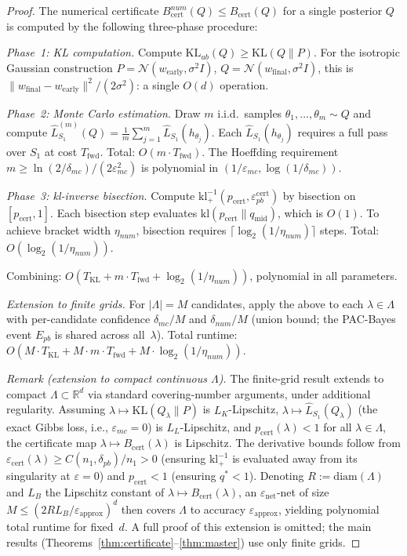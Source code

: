 \documentclass[11pt,a4paper]{article}
\newcommand{\kl}{\mathrm{kl}}
\newcommand{\KL}{\mathrm{KL}}
\newcommand{\R}{\mathbb{R}}
\newcommand{\klinv}{\kl^{-1}_+}
\begin{document}
\begin{proof}
The numerical certificate $B_{\mathrm{cert}}^{num}(Q) \le B_{\mathrm{cert}}(Q)$ for a single posterior $Q$ is computed by the following three-phase procedure:

\emph{Phase~1: KL computation.} Compute $\KL_{ub}(Q) \ge \KL(Q\|P)$. For the isotropic Gaussian construction $P = \mathcal{N}(w_{\mathrm{early}}, \sigma^2 I)$, $Q = \mathcal{N}(w_{\mathrm{final}}, \sigma^2 I)$, this is $\|w_{\mathrm{final}} - w_{\mathrm{early}}\|^2/(2\sigma^2)$: a single $O(d)$ operation.

\emph{Phase~2: Monte Carlo estimation.} Draw $m$ i.i.d.\ samples $\theta_1, \dots, \theta_m \sim Q$ and compute $\hat{L}_{S_1}^{(m)}(Q) = \frac{1}{m}\sum_{j=1}^m \hat{L}_{S_1}(h_{\theta_j})$. Each $\hat{L}_{S_1}(h_{\theta_j})$ requires a full pass over $S_1$ at cost $T_{\mathrm{fwd}}$. Total: $O(m \cdot T_{\mathrm{fwd}})$. The Hoeffding requirement $m \ge \ln(2/\delta_{mc})/(2\varepsilon_{mc}^2)$ is polynomial in $(1/\varepsilon_{mc}, \log(1/\delta_{mc}))$.

\emph{Phase~3: kl-inverse bisection.} Compute $\klinv(p_{\mathrm{cert}}, \varepsilon_{pb}^{\mathrm{cert}})$ by bisection on $[p_{\mathrm{cert}}, 1]$. Each bisection step evaluates $\kl(p_{\mathrm{cert}} \| q_{\mathrm{mid}})$, which is $O(1)$. To achieve bracket width $\eta_{num}$, bisection requires $\lceil \log_2(1/\eta_{num}) \rceil$ steps. Total: $O(\log_2(1/\eta_{num}))$.

Combining: $O(T_{\mathrm{KL}} + m \cdot T_{\mathrm{fwd}} + \log_2(1/\eta_{num}))$, polynomial in all parameters.

\emph{Extension to finite grids.} For $|\Lambda| = M$ candidates, apply the above to each $\lambda \in \Lambda$ with per-candidate confidence $\delta_{mc}/M$ and $\delta_{num}/M$ (union bound; the PAC-Bayes event $E_{pb}$ is shared across all~$\lambda$). Total runtime: $O(M \cdot T_{\mathrm{KL}} + M \cdot m \cdot T_{\mathrm{fwd}} + M \cdot \log_2(1/\eta_{num}))$.

\emph{Remark (extension to compact continuous $\Lambda$).} The finite-grid result extends to compact $\Lambda \subset \R^d$ via standard covering-number arguments, under additional regularity. Assuming $\lambda \mapsto \KL(Q_\lambda\|P)$ is $L_K$-Lipschitz, $\lambda \mapsto \hat{L}_{S_1}(Q_\lambda)$ (the exact Gibbs loss, i.e., $\varepsilon_{mc} = 0$) is $L_L$-Lipschitz, and $p_{\mathrm{cert}}(\lambda) < 1$ for all $\lambda \in \Lambda$, the certificate map $\lambda \mapsto B_{\mathrm{cert}}(\lambda)$ is Lipschitz. The derivative bounds follow from $\varepsilon_{\mathrm{cert}}(\lambda) \ge C(n_1,\delta_{pb})/n_1 > 0$ (ensuring $\klinv$ is evaluated away from its singularity at $\varepsilon = 0$) and $p_{\mathrm{cert}} < 1$ (ensuring $q^* < 1$). Denoting $R := \mathrm{diam}(\Lambda)$ and $L_B$ the Lipschitz constant of $\lambda \mapsto B_{\mathrm{cert}}(\lambda)$, an $\varepsilon_{\mathrm{net}}$-net of size $M \le (2R L_B / \varepsilon_{\mathrm{approx}})^d$ then covers $\Lambda$ to accuracy $\varepsilon_{\mathrm{approx}}$, yielding polynomial total runtime for fixed~$d$. A full proof of this extension is omitted; the main results (Theorems~\ref{thm:certificate}--\ref{thm:master}) use only finite grids.
\end{proof}
\end{document}
